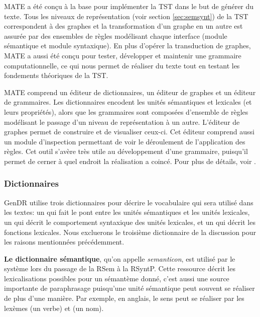 MATE a été conçu à la base pour implémenter la \ac{TST} dans le but de générer du texte. Tous les niveaux de représentation (voir section \ref{sec:semsynt}) de la \ac{TST} correspondent à des graphes et la transformation d'un graphe en un autre est assurée par des ensembles de règles modélisant chaque interface (module sémantique et module syntaxique). En plus d'opérer la transduction de graphes, MATE a aussi été conçu pour tester, développer et maintenir une grammaire computationnelle, ce qui nous permet de réaliser du texte tout en testant les fondements théoriques de la \ac{TST}.

MATE comprend un éditeur de dictionnaires, un éditeur de graphes et un éditeur de grammaires. Les dictionnaires encodent les unités sémantiques et lexicales (et leurs propriétés), alors que les grammaires sont composées d'ensemble de règles modélisant le passage d'un niveau de représentation à un autre. L'éditeur de graphes permet de construire et de visualiser ceux-ci. Cet éditeur comprend aussi un module d'inspection permettant de voir le déroulement de l'application des règles. Cet outil s'avère très utile au développement d'une grammaire, puisqu'il permet de cerner à quel endroit la réalisation a coincé. Pour plus de détails, voir \cite{BohnetOpensourcegraph2010,LambreyImplementationcollocationspour2017,LambreyGECOv1User}.


\subsubsection{Dictionnaires}\label{sec:dictio}

GenDR utilise trois dictionnaires pour décrire le vocabulaire qui sera utilisé dans les textes: un qui fait le pont entre les unités sémantiques et les unités lexicales, un qui décrit le comportement syntaxique des unités lexicales, et un qui décrit les fonctions lexicales. Nous excluerons le troisième dictionnaire de la discussion pour les raisons mentionnées précédemment.

\textbf{Le dictionnaire sémantique}, qu'on appelle \emph{semanticon}, est utilisé par le système lors du passage de la \ac{RSem} à la \ac{RSyntP}. Cette ressource décrit les lexicalisations possibles pour un sémantème donné, c'est aussi une source importante de paraphrasage puisqu'une unité sémantique peut souvent se réaliser de plus d'une manière. Par exemple, en anglais, le sens  peut se réaliser par les lexèmes  (un verbe) et  (un nom).


